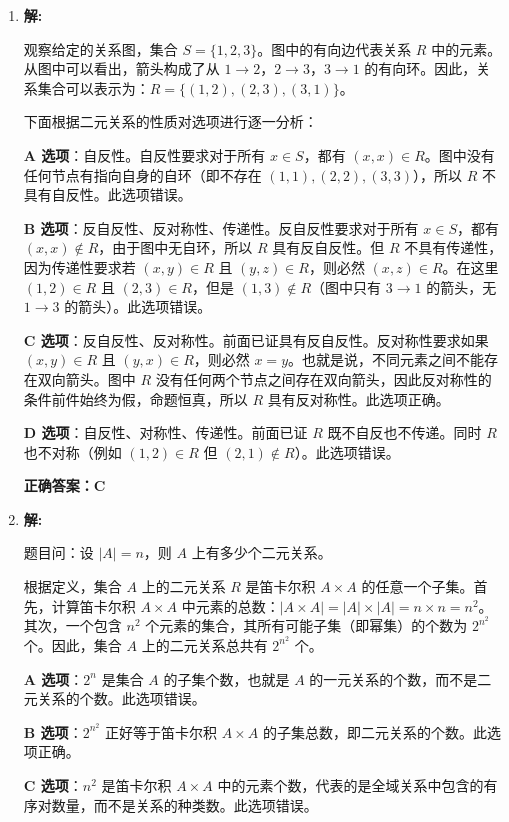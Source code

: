 \begin{enumerate}
	\item \textbf{解:}
	
	观察给定的关系图，集合 $S=\{1, 2, 3\}$。图中的有向边代表关系 $R$ 中的元素。从图中可以看出，箭头构成了从 $1 \to 2$，$2 \to 3$，$3 \to 1$ 的有向环。因此，关系集合可以表示为：$R = \{(1,2), (2,3), (3,1)\}$。
	
	下面根据二元关系的性质对选项进行逐一分析：
	
	\textbf{A 选项}：自反性。自反性要求对于所有 $x \in S$，都有 $(x,x) \in R$。图中没有任何节点有指向自身的自环（即不存在 $(1,1), (2,2), (3,3)$），所以 $R$ 不具有自反性。此选项错误。
	
	\textbf{B 选项}：反自反性、反对称性、传递性。反自反性要求对于所有 $x \in S$，都有 $(x,x) \notin R$，由于图中无自环，所以 $R$ 具有反自反性。但 $R$ 不具有传递性，因为传递性要求若 $(x,y) \in R$ 且 $(y,z) \in R$，则必然 $(x,z) \in R$。在这里 $(1,2)\in R$ 且 $(2,3)\in R$，但是 $(1,3)\notin R$（图中只有 $3 \to 1$ 的箭头，无 $1 \to 3$ 的箭头）。此选项错误。
	
	\textbf{C 选项}：反自反性、反对称性。前面已证具有反自反性。反对称性要求如果 $(x,y) \in R$ 且 $(y,x) \in R$，则必然 $x=y$。也就是说，不同元素之间不能存在双向箭头。图中 $R$ 没有任何两个节点之间存在双向箭头，因此反对称性的条件前件始终为假，命题恒真，所以 $R$ 具有反对称性。此选项正确。
	
	\textbf{D 选项}：自反性、对称性、传递性。前面已证 $R$ 既不自反也不传递。同时 $R$ 也不对称（例如 $(1,2) \in R$ 但 $(2,1) \notin R$）。此选项错误。
	
	\textbf{正确答案：C}
	\vspace{1em}
	
	\item \textbf{解:}
	
	题目问：设 $|A| = n$，则 $A$ 上有多少个二元关系。
	
	根据定义，集合 $A$ 上的二元关系 $R$ 是笛卡尔积 $A \times A$ 的任意一个子集。首先，计算笛卡尔积 $A \times A$ 中元素的总数：$|A \times A| = |A| \times |A| = n \times n = n^2$。其次，一个包含 $n^2$ 个元素的集合，其所有可能子集（即幂集）的个数为 $2^{n^2}$ 个。因此，集合 $A$ 上的二元关系总共有 $2^{n^2}$ 个。
	
	\textbf{A 选项}：$2^n$ 是集合 $A$ 的子集个数，也就是 $A$ 的一元关系的个数，而不是二元关系的个数。此选项错误。
	
	\textbf{B 选项}：$2^{n^2}$ 正好等于笛卡尔积 $A \times A$ 的子集总数，即二元关系的个数。此选项正确。
	
	\textbf{C 选项}：$n^2$ 是笛卡尔积 $A \times A$ 中的元素个数，代表的是全域关系中包含的有序对数量，而不是关系的种类数。此选项错误。
	

\end{enumerate}
